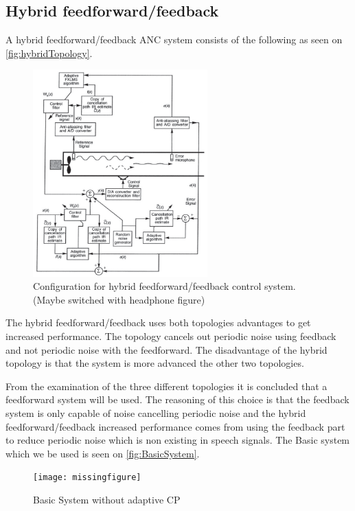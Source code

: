 \subsection*{Hybrid feedforward/feedback}    
A hybrid feedforward/feedback ANC system consists of the following as seen on \autoref{fig:hybridTopology}.
\begin{figure}[H]
	\centering
	\includegraphics[width=0.6\textwidth]{figures/BasicSystem/hybrid}
	\caption{Configuration for hybrid feedforward/feedback control system. (Maybe switched with headphone figure)}
	\label{fig:hybridTopology}
\end{figure}

The hybrid feedforward/feedback uses both topologies advantages to get increased performance. The topology cancels out periodic noise using feedback and not periodic noise with the feedforward. The disadvantage of the hybrid topology is that the system is more advanced the other two topologies.   

From the examination of the three different topologies it is concluded that a feedforward system will be used. The reasoning of this choice is that the feedback system is only capable of noise cancelling periodic noise and the hybrid feedforward/feedback increased performance comes from using the feedback part to reduce periodic noise which is non existing in speech signals. The Basic system which we be used is seen on \autoref{fig:BasicSystem}.

\begin{figure}[H]
	\centering
	\texttt{[image: missingfigure]}
	\caption{Basic System without adaptive CP}
	\label{fig:BasicSystem}
\end{figure}   

